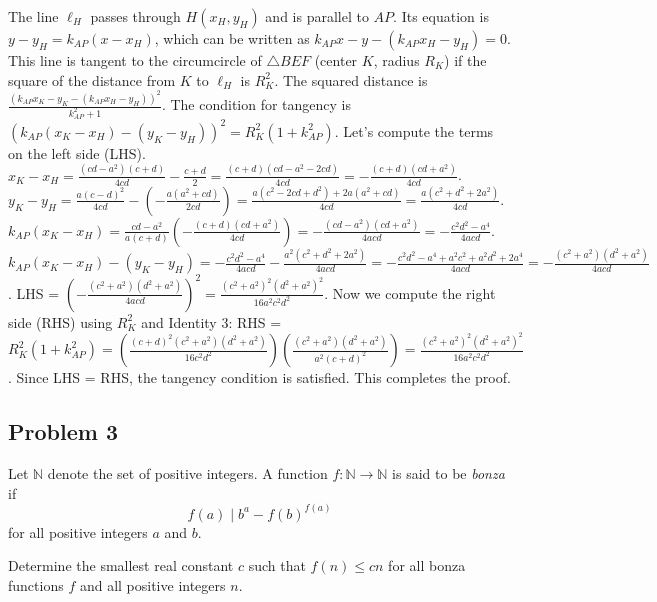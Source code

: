 The line $\ell_H$ passes through $H(x_H, y_H)$ and is parallel to $AP$. Its equation is $y-y_H = k_{AP}(x-x_H)$, which can be written as $k_{AP}x - y - (k_{AP}x_H - y_H) = 0$.
This line is tangent to the circumcircle of $\triangle BEF$ (center $K$, radius $R_K$) if the square of the distance from $K$ to $\ell_H$ is $R_K^2$. The squared distance is $\frac{(k_{AP}x_K - y_K - (k_{AP}x_H - y_H))^2}{k_{AP}^2+1}$.
The condition for tangency is $(k_{AP}(x_K-x_H)-(y_K-y_H))^2 = R_K^2(1+k_{AP}^2)$.
Let's compute the terms on the left side (LHS).
$x_K-x_H = \frac{(cd-a^2)(c+d)}{4cd} - \frac{c+d}{2} = \frac{(c+d)(cd-a^2-2cd)}{4cd} = -\frac{(c+d)(cd+a^2)}{4cd}$.
$y_K-y_H = \frac{a(c-d)^2}{4cd} - \left(-\frac{a(a^2+cd)}{2cd}\right) = \frac{a(c^2-2cd+d^2)+2a(a^2+cd)}{4cd} = \frac{a(c^2+d^2+2a^2)}{4cd}$.
$k_{AP}(x_K-x_H) = \frac{cd-a^2}{a(c+d)} \left(-\frac{(c+d)(cd+a^2)}{4cd}\right) = -\frac{(cd-a^2)(cd+a^2)}{4acd} = -\frac{c^2d^2-a^4}{4acd}$.
$k_{AP}(x_K-x_H)-(y_K-y_H) = -\frac{c^2d^2-a^4}{4acd} - \frac{a^2(c^2+d^2+2a^2)}{4acd} = -\frac{c^2d^2-a^4+a^2c^2+a^2d^2+2a^4}{4acd} = -\frac{(c^2+a^2)(d^2+a^2)}{4acd}$.
LHS = $\left(-\frac{(c^2+a^2)(d^2+a^2)}{4acd}\right)^2 = \frac{(c^2+a^2)^2(d^2+a^2)^2}{16a^2c^2d^2}$.
Now we compute the right side (RHS) using $R_K^2$ and Identity 3:
RHS = $R_K^2(1+k_{AP}^2) = \left(\frac{(c+d)^2(c^2+a^2)(d^2+a^2)}{16c^2d^2}\right) \left(\frac{(c^2+a^2)(d^2+a^2)}{a^2(c+d)^2}\right) = \frac{(c^2+a^2)^2(d^2+a^2)^2}{16a^2c^2d^2}$.
Since LHS = RHS, the tangency condition is satisfied. This completes the proof.

\subsection{Problem 3}

\begin{problem}
Let $\mathbb{N}$ denote the set of positive integers. A function $f : \mathbb{N} \to \mathbb{N}$ is said to be \textit{bonza} if
\[
f(a) \mid b^a - f(b)^{f(a)}
\]
for all positive integers $a$ and $b$.

Determine the smallest real constant $c$ such that $f(n) \le cn$ for all bonza functions $f$ and all positive integers $n$.
\end{problem}

